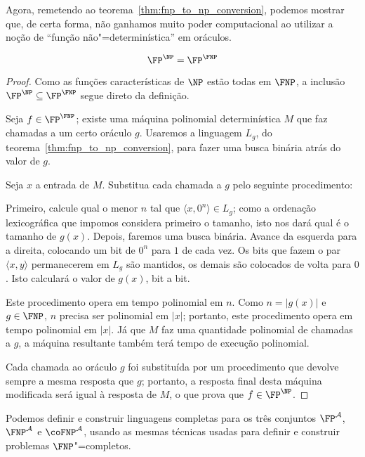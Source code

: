Agora,
remetendo ao teorema~\ref{thm:fnp_to_np_conversion},
podemos mostrar que,
de certa forma,
não ganhamos muito poder computacional
ao utilizar a noção de ``função não"=determinística'' em oráculos.

\begin{theorem}
    \begin{equation*}
        \FP^\NP = \FP^\FNP
    \end{equation*}
\end{theorem}

\begin{proof}
    Como as funções características de $\NP$ estão todas em $\FNP$,
    a inclusão $\FP^\NP \subseteq \FP^\FNP$ segue direto da definição.

    Seja $f \in \FP^\FNP$;
    existe uma máquina polinomial determinística $M$
    que faz chamadas a um certo oráculo $g$.
    Usaremos a linguagem $L_g$,
    do teorema~\ref{thm:fnp_to_np_conversion},
    para fazer uma busca binária atrás do valor de $g$.

    Seja $x$ a entrada de $M$.
    Substitua cada chamada a $g$
    pelo seguinte procedimento:

    Primeiro, calcule qual o menor $n$
    tal que $\langle x, 0^n \rangle \in L_g$;
    como a ordenação lexicográfica que impomos
    considera primeiro o tamanho,
    isto nos dará qual é o tamanho de $g(x)$.
    Depois,
    faremos uma busca binária.
    Avance da esquerda para a direita,
    colocando um bit de $0^n$ para $1$ de cada vez.
    Os bits que fazem o par $\langle x, y \rangle$
    permanecerem em $L_g$ são mantidos,
    os demais são colocados de volta para $0$.
    Isto calculará o valor de $g(x)$,
    bit a bit.

    Este procedimento opera em tempo polinomial em $n$.
    Como $n = |g(x)|$ e $g \in \FNP$,
    $n$ precisa ser polinomial em $|x|$;
    portanto, este procedimento opera em tempo polinomial em $|x|$.
    Já que $M$ faz uma quantidade polinomial de chamadas a $g$,
    a máquina resultante também terá tempo de execução polinomial.

    Cada chamada ao oráculo $g$ foi substituída por
    um procedimento que devolve sempre a mesma resposta que $g$;
    portanto, a resposta final desta máquina modificada
    será igual à resposta de $M$,
    o que prova que $f \in \FP^\NP$.
\end{proof}

Podemos definir e construir linguagens completas para os três conjuntos
$\FP^\mathcal A$, $\FNP^\mathcal A$ e $\coFNP^\mathcal A$,
usando as mesmas técnicas usadas para definir e construir problemas $\FNP$"=completos.

